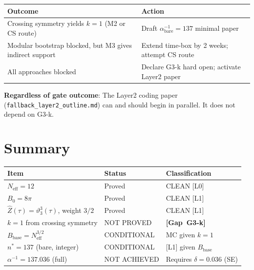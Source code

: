 \documentclass[12pt,a4paper]{article}
\theoremstyle{definition}
\theoremstyle{remark}
\newcommand{\GAP}[1]{\textbf{[Gap~#1]}}
\newcommand{\vth}{\vartheta}
\begin{document}
\begin{center}
\begin{tabular}{ll}
\toprule
\textbf{Outcome} & \textbf{Action} \\
\midrule
Crossing symmetry yields $k = 1$ (M2 or CS route) &
  Draft $\alpha^{-1}_{\mathrm{bare}} = 137$ minimal paper \\
Modular bootstrap blocked, but M3 gives indirect support &
  Extend time-box by 2 weeks; attempt CS route \\
All approaches blocked & Declare G3-k hard open;
  activate Layer2 paper \\
\bottomrule
\end{tabular}
\end{center}

\textbf{Regardless of gate outcome}: The Layer2 coding paper
(\texttt{fallback\_layer2\_outline.md}) can and should begin in parallel.
It does not depend on G3-k.

\section{Summary}
\label{sec:summary}

\begin{tcolorbox}[colback=blue!4!white,colframe=blue!55!black,
  title=Status at Document Creation (2026-04-28)]
\begin{center}
\begin{tabular}{lll}
\toprule
\textbf{Item} & \textbf{Status} & \textbf{Classification} \\
\midrule
$N_{\mathrm{eff}} = 12$ & Proved & CLEAN [L0] \\
$B_0 = 8\pi$ & Proved & CLEAN [L1] \\
$\hat{Z}(\tau) = \vth_3^3(\tau)$, weight $3/2$ & Proved & CLEAN [L1] \\
$k = 1$ from crossing symmetry & NOT PROVED & \GAP{G3-k} \\
$B_{\mathrm{base}} = N_{\mathrm{eff}}^{3/2}$ & CONDITIONAL & MC given $k=1$ \\
$n^* = 137$ (bare, integer) & CONDITIONAL & [L1] given $B_{\mathrm{base}}$ \\
$\alpha^{-1} = 137.036$ (full) & NOT ACHIEVED & Requires $\delta=0.036$ (SE) \\
\bottomrule
\end{tabular}
\end{center}
\end{tcolorbox}
\end{document}
